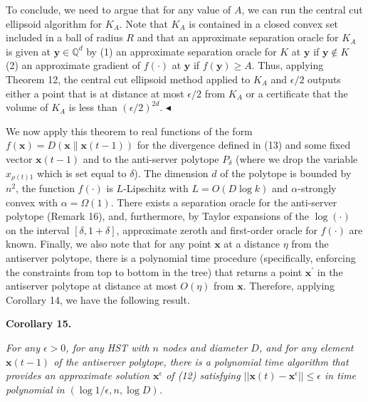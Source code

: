 To conclude, we need to argue that for any value of $A$, we can run the central cut ellipsoid algorithm for $K_{A}$. Note that $K_{A}$ is contained in a closed convex set included in a ball of radius $R$ and that an approximate separation oracle for $K_{A}$ is given at ${\boldsymbol{y}}\in\mathbb{Q}^{d}$ by (1) an approximate separation oracle for $K$ at ${\boldsymbol{y}}$ if ${\boldsymbol{y}}\not\in K$ (2) an approximate gradient of $f(\cdot)$ at ${\boldsymbol{y}}$ if $f({\boldsymbol{y}})\geq A$. Thus, applying Theorem 12, the central cut ellipsoid method applied to $K_{A}$ and $\epsilon/2$ outputs either a point that is at distance at most $\epsilon/2$ from $K_{A}$ or a certificate that the volume of $K_{A}$ is less than $(\epsilon/2)^{2d}$.
$\blacktriangleleft$\par




We now apply this theorem to real functions of the form $f({\boldsymbol{x}})=D({\boldsymbol{x}}\parallel{\boldsymbol{x}}(t-1))$ for the divergence defined in (13) and some fixed vector ${\boldsymbol{x}}(t-1)$ and to the anti-server polytope $P_{\delta}$ (where we drop the variable $x_{\rho(t)1}$ which is set equal to $\delta$). The dimension $d$ of the polytope is bounded by $n^{2}$, the function $f(\cdot)$ is $L$-Lipschitz with $L=O(D\log k)$ and $\alpha$-strongly convex with $\alpha=\Omega(1)$. There exists a separation oracle for the anti-server polytope (Remark 16), and, furthermore, by Taylor expansions of the $\log(\cdot)$ on the interval $[\delta,1+\delta]$, approximate zeroth and first-order oracle for $f(\cdot)$ are known. Finally, we also note that for any point ${\boldsymbol{x}}$ at a distance $\eta$ from the antiserver polytope, there is a polynomial time procedure (specifically, enforcing the constraints from top to bottom in the tree) that returns a point ${\boldsymbol{x}}^{\prime}$ in the antiserver polytope at distance at most $O(\eta)$ from ${\boldsymbol{x}}$. Therefore, applying Corollary 14, we have the following result.\par





\par\medskip\noindent\textbf{
\textbf{Corollary 15}\textbf{.}
}\par



\emph{For any $\epsilon>0$, for any HST with $n$ nodes and diameter $D$, and for any element ${\boldsymbol{x}}(t-1)$ of the antiserver polytope, there is a polynomial time algorithm that provides an approximate solution ${\boldsymbol{x}}^{\epsilon}$ of (12) satisfying $||{\boldsymbol{x}}(t)-{\boldsymbol{x}}^{\epsilon}||\leq\epsilon$ in time polynomial in $(\log 1/\epsilon,n,\log D)$.}\par




